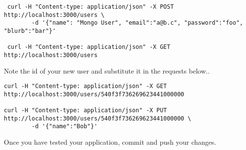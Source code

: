 \documentclass{article}
\begin{document}
\begin{verbatim}
 curl -H "Content-type: application/json" -X POST http://localhost:3000/users \ 
        -d '{"name": "Mongo User", "email":"a@b.c", "password":"foo", "blurb":"bar"}'

 curl -H "Content-type: application/json" -X GET http://localhost:3000/users
\end{verbatim}

Note the id of your new user and substitute it in the requests below..

\begin{verbatim}
curl -H "Content-type: application/json" -X GET http://localhost:3000/users/540f3f736269623441000000

curl -H "Content-type: application/json" -X PUT http://localhost:3000/users/540f3f736269623441000000 \
        -d '{"name":"Bob"}'
\end{verbatim}

Once you have tested your application, commit and push your changes.
\end{document}
